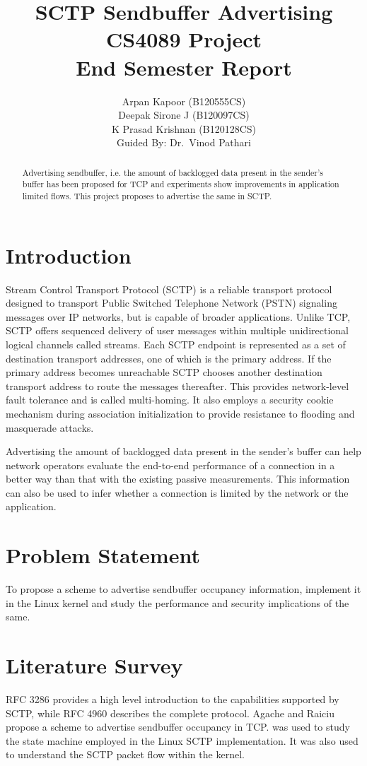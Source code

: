\documentclass[a4paper,11pt]{article}
\title{SCTP Sendbuffer Advertising\\
	{\normalsize CS4089 Project\\
		End Semester Report}}
\author{Arpan Kapoor (B120555CS)\\
	Deepak Sirone J (B120097CS)\\
	K Prasad Krishnan (B120128CS)\\
	Guided By: Dr.~Vinod Pathari}
\begin{document}
\maketitle

\begin{abstract}
Advertising sendbuffer, i.e.
the amount of backlogged data present in the sender's buffer 
has been proposed for TCP and experiments show
improvements in application limited flows.
This project proposes to advertise the same in SCTP.
\end{abstract}

\section{Introduction}
Stream Control Transport Protocol (SCTP) is a reliable transport protocol
designed to transport Public Switched Telephone Network (PSTN) signaling
messages over IP networks, but is capable of broader applications.
Unlike TCP, SCTP offers sequenced delivery of user messages within multiple
unidirectional logical channels called streams.
Each SCTP endpoint is represented as a set of destination transport addresses,
one of which is the primary address. If the primary address becomes unreachable
SCTP chooses another destination transport address to route the messages 
thereafter. This provides network-level fault tolerance and is called
multi-homing.
It also employs a security cookie mechanism during association initialization
to provide resistance to flooding and masquerade attacks.

Advertising the amount of backlogged data present in the sender's buffer can
help network operators evaluate the end-to-end performance of a connection
in a better way than that with the existing passive measurements.
This information can also be used to infer whether a connection is limited
by the network or the application.

\section{Problem Statement}
To propose a scheme to advertise sendbuffer occupancy information,
implement it in the Linux kernel and study the performance and security
implications of the same.

\section{Literature Survey}
RFC 3286 \cite{rfc3286} provides a high level introduction to the capabilities
supported by SCTP, while RFC 4960 \cite{rfc4960} describes the complete
protocol. Agache and Raiciu \cite{tcp-sndbufadv} propose a scheme to advertise
sendbuffer occupancy in TCP. \cite{budigerelinux} was used to study the state
machine employed in the Linux SCTP implementation. It was also used to 
understand the SCTP packet flow within the kernel.
\end{document}
